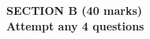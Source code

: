 \documentclass[a4paper,addpoints,12pt]{exam}   %
\begin{document}
\begin{questions}
  \begin{center}
    \textbf{SECTION B (40 marks)} \\
    \textbf{Attempt any 4 questions}
  \end{center}
  \question
  \begin{parts}
    \part[3] \droppoints
    \part[3] \droppoints
    \part[4] \droppoints
  \end{parts}

  \question
  \begin{parts}
    \part[3] \droppoints
    \part[3] \droppoints
    \part[4] \droppoints
  \end{parts}

  \question
  \begin{parts}
    \part[3] \droppoints
    \part[3] \droppoints
    \part[4] \droppoints
  \end{parts}


\end{questions}
\end{document}

